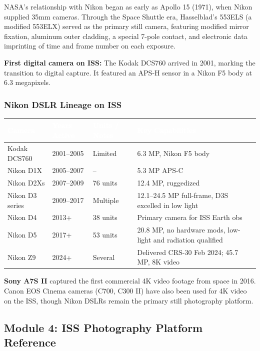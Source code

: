 \documentclass[11pt,letterpaper]{article}
\newcommand{\tableheader}[1]{\textbf{\sffamily\textcolor{white}{#1}}}
\begin{document}
NASA's relationship with Nikon began as early as Apollo 15 (1971), when Nikon supplied 35mm cameras. Through the Space Shuttle era, Hasselblad's 553ELS (a modified 553ELX) served as the primary still camera, featuring modified mirror fixation, aluminum outer cladding, a special 7-pole contact, and electronic data imprinting of time and frame number on each exposure.

\textbf{First digital camera on ISS:} The Kodak DCS760 arrived in 2001, marking the transition to digital capture. It featured an APS-H sensor in a Nikon F5 body at 6.3 megapixels.

\subsubsection{Nikon DSLR Lineage on ISS}

\begin{center}
\begin{tabularx}{\textwidth}{L{2.5cm}C{1.8cm}L{2.5cm}X}
\toprule
{}
\tableheader{Camera} & \tableheader{Years Active} & \tableheader{Units / Notes} & \tableheader{Key Capabilities} \\
\midrule
Kodak DCS760 & 2001--2005 & Limited & 6.3 MP, Nikon F5 body \\
Nikon D1X & 2005--2007 & -- & 5.3 MP APS-C \\
Nikon D2Xs & 2007--2009 & 76 units & 12.4 MP, ruggedized \\
Nikon D3 series & 2009--2017 & Multiple & 12.1--24.5 MP full-frame, D3S excelled in low light \\
Nikon D4 & 2013+ & 38 units & Primary camera for ISS Earth obs \\
Nikon D5 & 2017+ & 53 units & 20.8 MP, no hardware mods, low-light and radiation qualified \\
Nikon Z9 & 2024+ & Several & Delivered CRS-30 Feb 2024; 45.7 MP, 8K video \\
\bottomrule
\end{tabularx}
\end{center}

\textbf{Sony A7S II} captured the first commercial 4K video footage from space in 2016. Canon EOS Cinema cameras (C700, C300 II) have also been used for 4K video on the ISS, though Nikon DSLRs remain the primary still photography platform.

\subsection{Module 4: ISS Photography Platform Reference}
\end{document}
